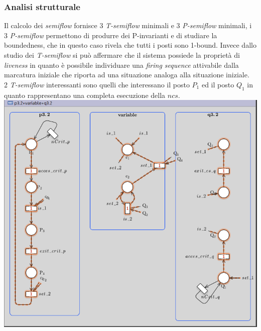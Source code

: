 \documentclass[a4paper]{article}
\begin{document}
\subsubsection{Analisi strutturale}
Il calcolo dei \textit{semiflow} fornisce 3 \textit{T-semiflow} minimali e 3 \textit{P-semiflow} minimali, i 3 \textit{P-semiflow} permettono di produrre dei P-invarianti e di studiare la boundedness, che in questo caso rivela che tutti i posti sono 1-bound.
Invece dallo studio dei \textit{T-semiflow} si può affermare che il sistema possiede la proprietà di \textit{liveness} in quanto è possibile individuare una \textit{ﬁring sequence} attivabile dalla marcatura iniziale che riporta ad una situazione analoga alla situazione iniziale.\\
2 \textit{T-semiflow} interessanti sono quelli che interessano il posto $P_1$ ed il posto  $Q_1$ in quanto rappresentano una completa esecuzione della $ncs$.\\
\includegraphics[width=1\textwidth]{3.2T.png}
\newpage
\end{document}
